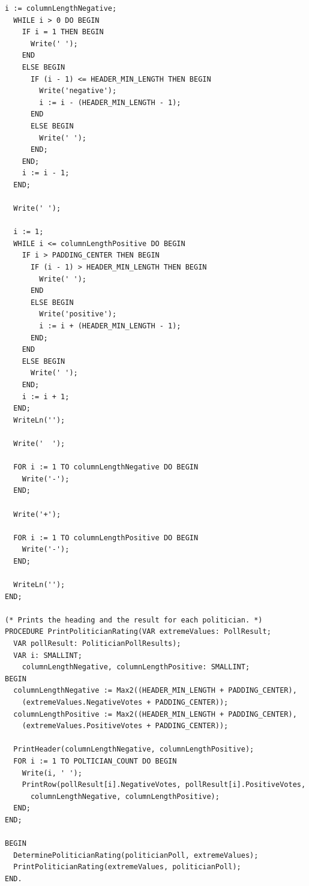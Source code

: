 \documentclass[a4paper]{article}
\begin{document}
\begin{enumerate}
\begin{lstlisting}[resetmargins=true]
  i := columnLengthNegative;
  WHILE i > 0 DO BEGIN
    IF i = 1 THEN BEGIN
      Write(' ');
    END
    ELSE BEGIN
      IF (i - 1) <= HEADER_MIN_LENGTH THEN BEGIN
        Write('negative');
        i := i - (HEADER_MIN_LENGTH - 1);
      END
      ELSE BEGIN
        Write(' ');
      END;
    END;
    i := i - 1;
  END;

  Write(' ');

  i := 1;
  WHILE i <= columnLengthPositive DO BEGIN
    IF i > PADDING_CENTER THEN BEGIN
      IF (i - 1) > HEADER_MIN_LENGTH THEN BEGIN
        Write(' ');
      END
      ELSE BEGIN
        Write('positive');
        i := i + (HEADER_MIN_LENGTH - 1);
      END;
    END
    ELSE BEGIN
      Write(' ');
    END;
    i := i + 1;
  END;
  WriteLn('');

  Write('  ');

  FOR i := 1 TO columnLengthNegative DO BEGIN
    Write('-');
  END;

  Write('+');

  FOR i := 1 TO columnLengthPositive DO BEGIN
    Write('-');
  END;

  WriteLn('');
END;

(* Prints the heading and the result for each politician. *)
PROCEDURE PrintPoliticianRating(VAR extremeValues: PollResult;
  VAR pollResult: PoliticianPollResults);
  VAR i: SMALLINT;
    columnLengthNegative, columnLengthPositive: SMALLINT;
BEGIN
  columnLengthNegative := Max2((HEADER_MIN_LENGTH + PADDING_CENTER),
    (extremeValues.NegativeVotes + PADDING_CENTER));
  columnLengthPositive := Max2((HEADER_MIN_LENGTH + PADDING_CENTER),
    (extremeValues.PositiveVotes + PADDING_CENTER));

  PrintHeader(columnLengthNegative, columnLengthPositive);
  FOR i := 1 TO POLTICIAN_COUNT DO BEGIN
    Write(i, ' ');
    PrintRow(pollResult[i].NegativeVotes, pollResult[i].PositiveVotes,
      columnLengthNegative, columnLengthPositive);
  END;
END;

BEGIN
  DeterminePoliticianRating(politicianPoll, extremeValues);
  PrintPoliticianRating(extremeValues, politicianPoll);
END.
		\end{lstlisting}
		

\end{enumerate}
\end{document}
